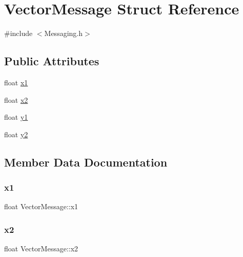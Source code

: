 \hypertarget{struct_vector_message}{}\section{Vector\+Message Struct Reference}
\label{struct_vector_message}


{\ttfamily \#include $<$Messaging.\+h$>$}

\subsection*{Public Attributes}
\begin{DoxyCompactItemize}
\item 
float \hyperlink{struct_vector_message_a5bd1b08df30dd88eff97b8592bfb9b7b}{x1}
\item 
float \hyperlink{struct_vector_message_a258afdb8ab131486fdf950aec2f62255}{x2}
\item 
float \hyperlink{struct_vector_message_a7df2ce9a277b6a8a8451a1a37c973a7d}{y1}
\item 
float \hyperlink{struct_vector_message_aad5bfaa77094e6f5b4620bf4c2a07862}{y2}
\end{DoxyCompactItemize}


\subsection{Member Data Documentation}
\mbox{\label{struct_vector_message_a5bd1b08df30dd88eff97b8592bfb9b7b}} 
\subsubsection{\texorpdfstring{x1}{x1}}
{\footnotesize\ttfamily float Vector\+Message\+::x1}

\mbox{\label{struct_vector_message_a258afdb8ab131486fdf950aec2f62255}} 
\subsubsection{\texorpdfstring{x2}{x2}}
{\footnotesize\ttfamily float Vector\+Message\+::x2}

\mbox{\label{struct_vector_message_a7df2ce9a277b6a8a8451a1a37c973a7d}} 
